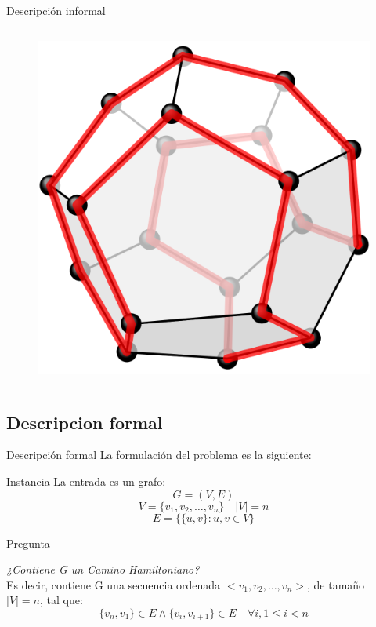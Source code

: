 \documentclass{beamer}
\begin{document}
\begin{frame}{Descripción informal}
\begin{columns}
\begin{figure}
            \includegraphics[scale=0.08]{images/icosaedro.png}
        \end{figure}
    \end{columns}
\end{frame}

\subsection{Descripcion formal}
\begin{frame}{Descripción formal}
    La formulación del problema es la siguiente:
    \begin{block}{Instancia}
        La entrada es un grafo:
        \[G=(V, E)\]
        \[V = \{v_1, v_2, \dots, v_n\} \quad |V| = n\]
        \[E = \{\{u, v\} : u, v \in V\}\]
    \end{block}
    \begin{block}{Pregunta}
        \begin{center}
            \textit{¿Contiene G un Camino Hamiltoniano?}\\
            Es decir, contiene G una secuencia ordenada $\displaystyle <v_1, v_2, \dots, v_n>$,
            de tamaño $|V| = n$, tal que:
            \[\{v_n, v_1\} \in E \land \{v_i, v_{i+1}\} \in E \quad \forall i, 1 \le i < n\]
        \end{center}
    \end{block}
\end{frame}
\end{document}
